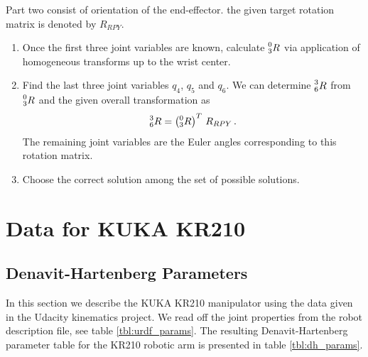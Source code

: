 \documentclass[11pt, onecolumn, oneside, reqno]{article}
\begin{document}
Part two consist of orientation of the end-effector. the given target rotation matrix is denoted by $R_{RPY}$.
\begin{enumerate}
\item Once the first three joint variables are known, calculate $\prescript{0}{3} R$ via application of homogeneous transforms up to the wrist center.
\item Find the last three joint variables $q_4$, $q_5$ and $q_6$. We can determine $\prescript{3}{6} R$ from $\prescript{0}{3} R$ and the given overall transformation as
\begin{equation}
\prescript{3}{6} R = \left(\prescript{0}{3} R\right)^{T} \, R_{RPY} \, .
\end{equation}
The remaining joint variables are the Euler angles corresponding to this rotation matrix.
\item Choose the correct solution among the set of possible solutions.
\end{enumerate}

\newpage

\section{Data for KUKA KR210}
\subsection{Denavit-Hartenberg Parameters}
In this section we describe the KUKA KR210 manipulator using the data given in the Udacity kinematics project. We read off the joint properties from the robot description file, see table \ref{tbl:urdf_params}. The resulting Denavit-Hartenberg parameter table for the KR210 robotic arm is presented in table \ref{tbl:dh_params}.
\end{document}
